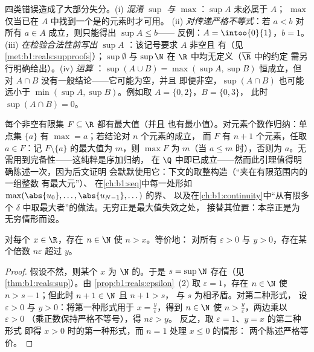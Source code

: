 \begin{remark}[上、下确界的常见错误]
四类错误造成了大部分失分。(i) \emph{混淆
$\sup$ 与 $\max$}：$\sup A$ 未必属于 $A$；
$\max$ 仅当已在 $A$ 中找到一个是的元素时才可用。
(ii) \emph{对传递严格不等式}：若 $a <
b$ 对所有 $a \in A$ 成立，则只能得出 $\sup A \leq b$——
反例：$A = \intoo{0}{1}$，$b = 1$。(iii) \emph{在检验合法性前写出 $\sup A$
}：该记号要求 $A$ 非空且
有（见\cref{met:b1:reals:supproofs}）；$\sup \emptyset$
与 $\sup \N$ 在 $\R$ 中均无定义（$\overline\R$ 中的约定
需另行明确给出）。(iv) \emph{运算
}：$\sup(A \cup B) = \max(\sup A, \sup B)$ 恒成立，但
对 $A \cap B$ 没有一般结论——它可能为空，并且
即便非空，$\sup(A \cap B)$ 也可能远小于
$\min(\sup A, \sup B)$。例如取 $A = \{0, 2\}$，$B = \{0, 3\}$，
此时 $\sup(A \cap B) = 0$。
\end{remark}

\begin{example}\label{ex:b1:reals:finitemax}
每个非空有限集 $F \subseteq \R$ 都有最大值（并且
也有最小值）。对元素个数作归纳：单点集
$\{a\}$ 有 $\max = a$；若结论对 $n$ 个元素的成立，
而 $F$ 有 $n + 1$ 个元素，任取 $a \in F$：记 $F
\setminus \{a\}$ 的最大值为 $m$，则 $\max F$ 为 $m$（当 $a
\leq m$ 时），否则为 $a$。无需用到完备性——这纯粹是序加归纳，
在 $\Q$ 中即已成立——然而此引理值得明确陈述一次，因为后文证明
会默默使用它：下文的取整构造（“夹在有限范围内的一组整数
有最大元”）、
在\cref{ch:b1:seq}中每一处形如
$\max(\abs{u_0}, \dots, \abs{u_{N-1}}, \dots)$ 的界、
以及在\cref{ch:b1:continuity}中“从有限多个
$\delta$ 中取最大者”的做法。无穷正是最大值失效之处，
接替其位置：本章正是为
无穷情形而设。
\end{example}

\begin{theorem}[阿基米德性质]\label{thm:b1:reals:archimedes}
对每个 $x \in \R$，存在 $n \in \N$ 使 $n > x$。等价地：
对所有 $\varepsilon > 0$ 与 $y > 0$，存在某个倍数 $n\varepsilon$
超过 $y$。
\end{theorem}

\begin{proof}
假设不然，则某个 $x$ 为 $\N$ 的。于是 $s = \sup \N$
存在（见\cref{thm:b1:reals:sup}）。由
\cref{prop:b1:reals:epsilon}~(2) 取 $\varepsilon = 1$，存在 $n
\in \N$ 使 $n > s - 1$；但此时 $n + 1 \in \N$ 且 $n + 1 > s$，
与 $s$ 为相矛盾。对第二种形式，
设 $\varepsilon > 0$ 与 $y > 0$：将第一种形式用于 $x
= \frac{y}{\varepsilon}$，得到 $n \in \N$ 使 $n >
\frac{y}{\varepsilon}$，两边乘以 $\varepsilon > 0$
（乘正数保持严格不等号），得 $n\varepsilon > y$。
反之，取 $\varepsilon = 1$、$y = x$ 的第二种形式
即得 $x > 0$ 时的第一种形式，而 $n = 1$ 处理 $x \leq 0$ 的情形：
两个陈述严格等价。
\end{proof}


